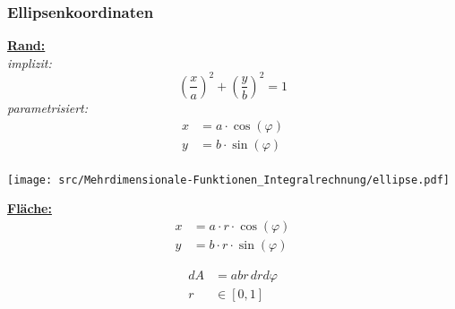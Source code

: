 \subsubsection{Ellipsenkoordinaten}
    \begin{minipage}{0.49\linewidth}
        \vspace{0.5em}
        \underline{\textbf{Rand:}}\\
        \textit{implizit:}
        $$
            \left( \frac{x}{a} \right)^2 + \left( \frac{y}{b} \right)^2 = 1
        $$
        \textit{parametrisiert:}
        \begin{align*}
            x &= a \cdot \cos(\varphi)\\
            y &= b \cdot \sin(\varphi)\\
        \end{align*}
    \end{minipage}
    \begin{minipage}{0.5\linewidth}
        \texttt{[image: src/Mehrdimensionale-Funktionen\_Integralrechnung/ellipse.pdf]}
    \end{minipage}\vspace{-1em}
    \begin{minipage}{0.49\linewidth}
        \textbf{\underline{Fläche:}}
            \begin{align*}
                x &= a \cdot r \cdot \cos(\varphi)\\
                y &= b \cdot r \cdot \sin(\varphi)
            \end{align*}
    \end{minipage}
    \begin{minipage}{0.5\linewidth}
        \vspace{0.8em}
        \begin{align*}
            dA &= abr \, dr d\varphi\\
            r &\in [0,1]
        \end{align*}
    \end{minipage}
        